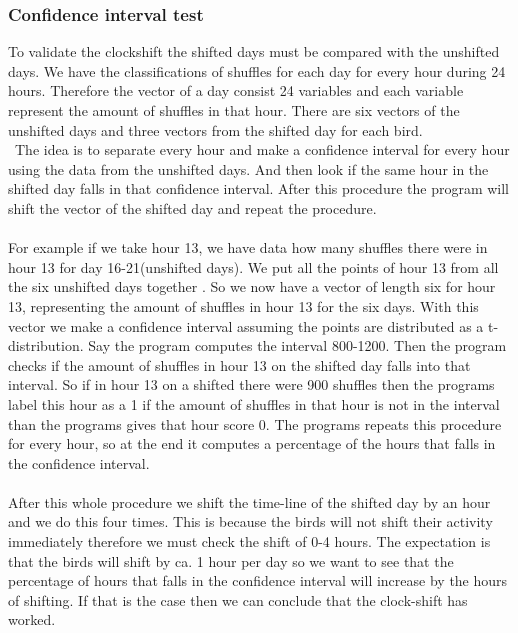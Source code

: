 \documentclass[a4paper]{article}
\begin{document}
\subsubsection*{Confidence interval test}
To validate the clockshift the shifted days must be compared with the unshifted days. We have the classifications of shuffles for each day for every hour during 24 hours. Therefore the vector of a day consist 24 variables and each variable represent the amount of shuffles in that hour. There are six vectors of the unshifted days and three vectors from the shifted day for each bird.\\\
The idea is to separate every hour and make a confidence interval for every hour using the data from the unshifted days. And then look if the same hour in the shifted day falls in that confidence interval. After this procedure the program will shift the vector of the shifted day and repeat the procedure.\\\\ 
For example if we take hour 13, we have data how many shuffles there were in hour 13 for day 16-21(unshifted days). We put all the points of hour 13 from all the six unshifted days together . So we now have a vector of length six for hour 13, representing the amount of shuffles in hour 13 for the six days. With this vector we make a confidence interval assuming the points are distributed as a t-distribution. Say the program computes the interval 800-1200. Then the program checks if  the amount of shuffles in hour 13 on the shifted day falls into that interval. So if in hour 13 on a shifted there were 900 shuffles then the programs label this hour as a 1 if the amount of shuffles in that hour is not in the interval than the programs gives that hour score 0.  The programs repeats this procedure for every hour, so at the end it computes a percentage of the hours that falls in the confidence interval.\\\\
After this whole procedure we shift the time-line of the shifted day by an hour and we do this four times. This is because the birds will not shift their activity immediately therefore we must check the shift of 0-4 hours. The expectation is that the birds will shift by ca. 1 hour per day so we want to see that the percentage of hours that falls in the confidence interval will increase by the hours of shifting. If that is the case then we can conclude that the clock-shift has worked. 

\end{document}
